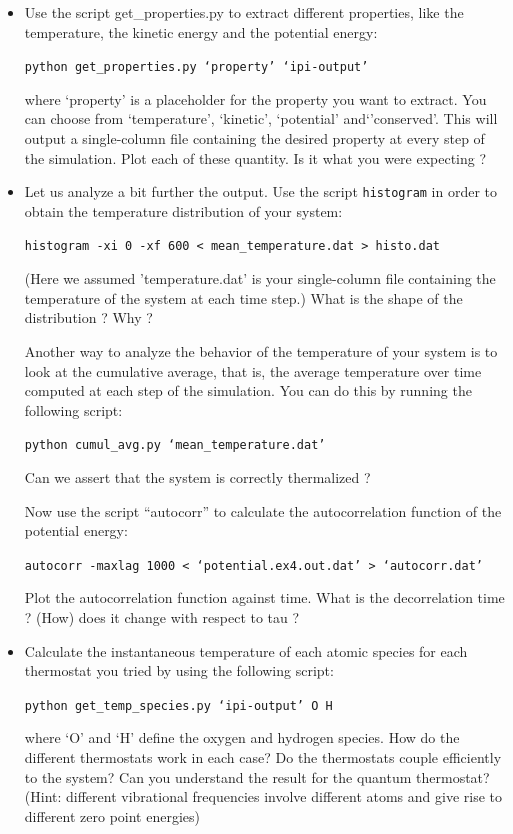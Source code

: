 \documentclass[a4paper,11pt]{scrartcl}
\begin{document}
\begin{itemize}
\item Use the script get\_properties.py to extract different properties, like the temperature, the kinetic energy and the potential energy:

\texttt{python get\_properties.py  `property' `ipi-output'}

where `property' is a placeholder for the property you want to extract. You can choose from `temperature', `kinetic', `potential' and`'conserved'.
This will output a single-column file containing the desired property at every step of the simulation.
Plot each of these quantity. Is it what you were expecting ?

\item Let us analyze a bit further the output.
Use the script \texttt{histogram} in order to obtain the temperature distribution of your system:

\texttt{histogram -xi 0 -xf 600 < mean\_temperature.dat > histo.dat}

(Here we assumed 'temperature.dat' is your single-column file containing the temperature of the system at each time step.)
What is the shape of the distribution ? Why ?

Another way to analyze the behavior of the temperature of your system is to look at the cumulative average, that is, the average temperature over time computed at each step of the simulation. You can do this by running the following script:

\texttt{python cumul\_avg.py `mean\_temperature.dat'}

Can we assert that the system is correctly thermalized ?

Now use the script ``autocorr'' to calculate the autocorrelation function of the potential energy:

\texttt{autocorr -maxlag 1000 < `potential.ex4.out.dat' > `autocorr.dat'}

Plot the autocorrelation function against time. What is the decorrelation time ? (How) does it change with respect to tau ?


\item Calculate the instantaneous temperature of each atomic species for each thermostat you tried by using the following script:

\texttt{python get\_temp\_species.py  `ipi-output' O H}

where `O' and `H' define the oxygen and hydrogen species. How do the different thermostats work in each case? 
Do the thermostats couple efficiently to the system?
Can you understand the result for the quantum thermostat? 
(Hint: different vibrational frequencies involve different atoms and give rise to different zero point energies)



\end{itemize}
\end{document}
